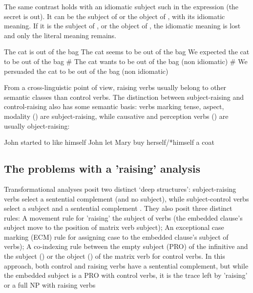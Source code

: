 \documentclass[output=paper]{langsci/langscibook}
\begin{document}
 The same contrast holds with an idiomatic subject such  in the expression  (the secret is out). It can be the subject of  or the object of , with its idiomatic meaning. If it is the subject of , or the object of , the idiomatic meaning is lost and only the literal meaning remains.
 
 	\begin{exe}
	\ex \begin{xlist}
	\ex The cat is out of the bag
   \ex 	The cat seems to be out of the bag
\ex We expected the cat to be out of the bag
\ex \# The cat wants to be out of the bag (non idiomatic)
\ex 	\# We persuaded the cat to be out of the bag (non idiomatic)
 \end{xlist}
	\end{exe}

	From a cross-linguistic point of view, raising verbs usually belong to other semantic classes than control verbs. The distinction between subject-raising and control-raising also has some semantic basis: verbs marking tense, aspect, modality () are subject-raising, while
causative and perception verbs () are usually object-raising:

	\begin{exe}
\ex  \begin{xlist}
\ex John started to like himself
\ex John let Mary buy herself/*himself a coat
	 \end{xlist}
	 \end{exe}
	
\subsection{The problems with a 'raising' analysis}

Transformational analyses posit two distinct `deep structures': subject-raising verbs select a sentential complement (and no subject), while subject-control verbs select a subject and a sentential complement \citep{Postal1974, Chomsky1981}. They also
posit three distinct rules:  A movement rule for 'raising' the subject of  verbs (the embedded clause's subject move to the position of matrix verb subject); An exceptional case marking (ECM) rule for assigning case to the embedded clause's subject of  verbs); A co-indexing rule between the empty subject (PRO) of the infinitive and the subject () or the object () of the matrix verb for control verbs.
In this approach, both control and raising verbs have a sentential complement, but while the embedded subject is a PRO with control verbs, it is the trace left by 'raising' or a full NP with raising verbs
	
\end{document}
